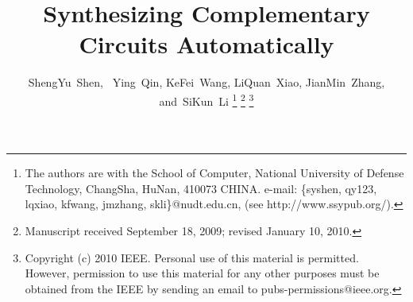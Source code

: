 \documentclass[journal]{IEEEtran}
\begin{document}
%
\title{Synthesizing Complementary Circuits Automatically}
%
%
%


\author{ShengYu~Shen,~
        Ying~Qin,
        KeFei~Wang,
        LiQuan~Xiao,
        JianMin~Zhang,
        and~SiKun~Li%
\thanks{The authors are with the School of Computer,
National University of Defense Technology, ChangSha,
HuNan, 410073 CHINA. e-mail: \{syshen, qy123, lqxiao, kfwang, jmzhang, skli\}@nudt.edu.cn, (see http://www.ssypub.org/).}%
\thanks{Manuscript received September 18, 2009; revised January 10, 2010.}
\thanks{Copyright (c) 2010 IEEE. Personal use of this material is
permitted. However, permission to use this material
for any other purposes must be obtained from the IEEE by
sending an email to pubs-permissions@ieee.org.}}
\end{document}
